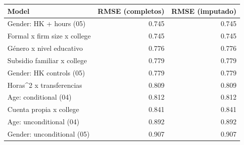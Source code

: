 
\begin{tabular}[t]{lrr}
\toprule
Model & RMSE (completos) & RMSE (imputado)\\
\midrule
Gender: HK + hours (05) & 0.745 & 0.745\\
Formal x firm size x college & 0.745 & 0.745\\
Género x nivel educativo & 0.776 & 0.776\\
Subsidio familiar x college & 0.779 & 0.779\\
Gender: HK controls (05) & 0.779 & 0.779\\
\addlinespace
Horas\textasciicircum{}2 x transferencias & 0.809 & 0.809\\
Age: conditional (04) & 0.812 & 0.812\\
Cuenta propia x college & 0.841 & 0.841\\
Age: unconditional (04) & 0.892 & 0.892\\
Gender: unconditional (05) & 0.907 & 0.907\\
\bottomrule
\end{tabular}
